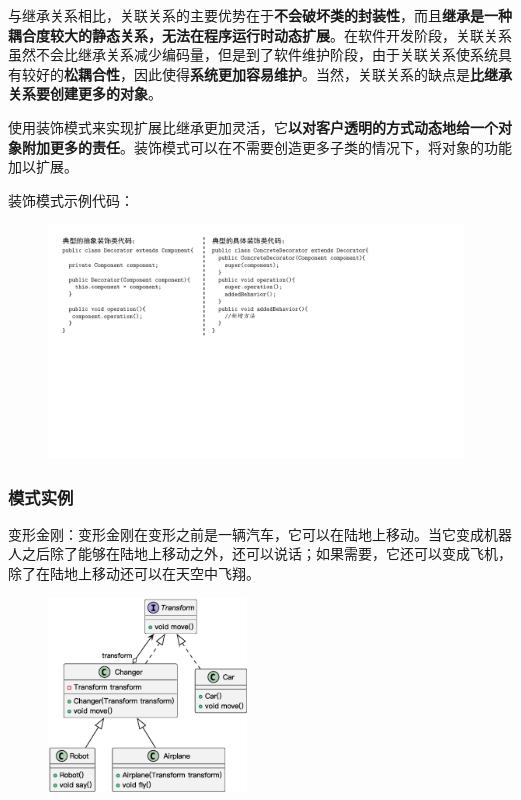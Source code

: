 与继承关系相比，关联关系的主要优势在于\textbf{不会破坏类的封装性}，而且\textbf{继承是一种耦合度较大的静态关系，无法在程序运行时动态扩展}。在软件开发阶段，关联关系虽然不会比继承关系减少编码量，但是到了软件维护阶段，由于关联关系使系统具有较好的\textbf{松耦合性}，因此使得\textbf{系统更加容易维护}。当然，关联关系的缺点是\textbf{比继承关系要创建更多的对象}。

使用装饰模式来实现扩展比继承更加灵活，它\textbf{以对客户透明的方式动态地给一个对象附加更多的责任}。装饰模式可以在不需要创造更多子类的情况下，将对象的功能加以扩展。

装饰模式示例代码：
\begin{figure}[H]
    \vspace{-0.5em}
	\centering
	\includegraphics[width=0.98\textwidth]{images/装饰模式典型代码.pdf}
    \vspace{-1em}
\end{figure}

\subsubsection{模式实例}
变形金刚：变形金刚在变形之前是一辆汽车，它可以在陆地上移动。当它变成机器人之后除了能够在陆地上移动之外，还可以说话；如果需要，它还可以变成飞机，除了在陆地上移动还可以在天空中飞翔。
\begin{figure}[H]
    \vspace{-0.5em}
	\centering
	\includegraphics[width=0.47\textwidth]{images/装饰模式实例1.eps}
    \vspace{-1em}
\end{figure}

